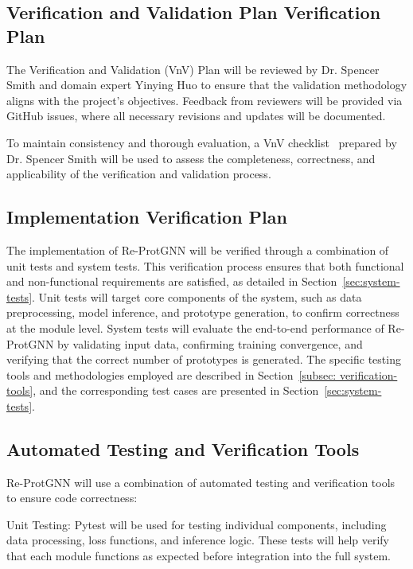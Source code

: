\documentclass[12pt, titlepage]{article}
\begin{document}
\subsection{Verification and Validation Plan Verification Plan}
\label{sec:vvp}
The Verification and Validation (VnV) Plan will be reviewed by Dr. Spencer Smith and domain expert Yinying Huo to ensure that the validation methodology aligns with the project’s objectives. Feedback from reviewers will be provided via GitHub issues, where all necessary revisions and updates will be documented.

To maintain consistency and thorough evaluation, a VnV checklist~\citep{Yuanqi_ReProtGNN_VnVChecklist} prepared by Dr. Spencer Smith will be used to assess the completeness, correctness, and applicability of the verification and validation process. 


\subsection{Implementation Verification Plan}
\label{sec:ivp}

The implementation of Re-ProtGNN will be verified through a combination of unit tests and system tests. This verification process ensures that both functional and non-functional requirements are satisfied, as detailed in Section~\ref{sec:system-tests}. Unit tests will target core components of the system, such as data preprocessing, model inference, and prototype generation, to confirm correctness at the module level. System tests will evaluate the end-to-end performance of Re-ProtGNN by validating input data, confirming training convergence, and verifying that the correct number of prototypes is generated. The specific testing tools and methodologies employed are described in Section~\ref{subsec: verification-tools}, and the corresponding test cases are presented in Section~\ref{sec:system-tests}.





\subsection{Automated Testing and Verification Tools}
\label{sec:att}
\label{subsec: verification-tools}
Re-ProtGNN will use a combination of automated testing and verification tools to ensure code correctness:

Unit Testing:
Pytest will be used for testing individual components, including data processing, loss functions, and inference logic. These tests will help verify that each module functions as expected before integration into the full system.
\end{document}

